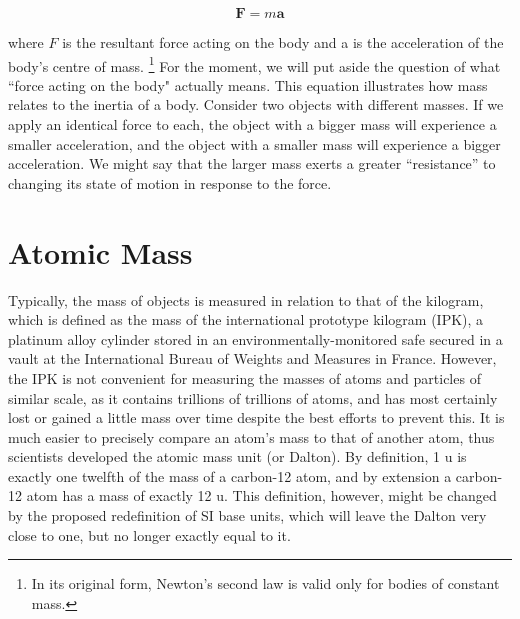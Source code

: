 \documentclass{book}
\begin{document}
    \begin{equation}
    {\displaystyle \mathbf {F} =m\mathbf {a}} \nonumber
    \end{equation}
    
    where $F$ is the resultant force acting on the body and a is the acceleration of the body's centre of mass. \footnote{ In its original form, Newton's second law is valid only for bodies of constant mass.} For the moment, we will put aside the question of what ``force acting on the body" actually means. This equation illustrates how mass relates to the inertia of a body. Consider two objects with different masses. If we apply an identical force to each, the object with a bigger mass will experience a smaller acceleration, and the object with a smaller mass will experience a bigger acceleration. We might say that the larger mass exerts a greater ``resistance'' to changing its state of motion in response to the force.
    
    \section{Atomic Mass}
    Typically, the mass of objects is measured in relation to that of the kilogram, which is defined as the mass of the international prototype kilogram (IPK), a platinum alloy cylinder stored in an environmentally-monitored safe secured in a vault at the International Bureau of Weights and Measures in France. However, the IPK is not convenient for measuring the masses of atoms and particles of similar scale, as it contains trillions of trillions of atoms, and has most certainly lost or gained a little mass over time despite the best efforts to prevent this. It is much easier to precisely compare an atom's mass to that of another atom, thus scientists developed the atomic mass unit (or Dalton). By definition, 1 u is exactly one twelfth of the mass of a carbon-12 atom, and by extension a carbon-12 atom has a mass of exactly 12 u. This definition, however, might be changed by the proposed redefinition of SI base units, which will leave the Dalton very close to one, but no longer exactly equal to it.
    
\end{document}
